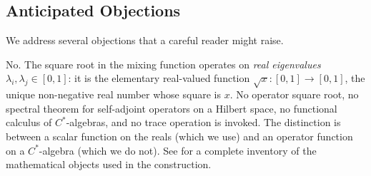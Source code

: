 \subsection{Anticipated Objections}\label{subsec:objections}

We address several objections that a careful reader might raise.

\begin{remark}
\label{rem:sqrt-objection}
No.  The square root in the mixing function operates on \emph{real
eigenvalues} $\lambda_{i}, \lambda_{j} \in [0,1]$: it is the
elementary real-valued function $\sqrt{x} : [0,1] \to [0,1]$, the
unique non-negative real number whose square is $x$.  No operator
square root, no spectral theorem for self-adjoint operators on a
Hilbert space, no functional calculus of $C^{*}$-algebras, and no
trace operation is invoked.  The distinction is between a scalar
function on the reals (which we use) and an operator function on a
$C^{*}$-algebra (which we do not).  See  for a
complete inventory of the mathematical objects used in the
construction.
\end{remark}

